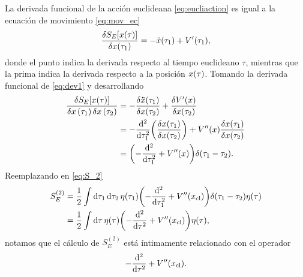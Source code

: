 La derivada funcional de la acción euclideana \eqref{eq:eucliaction} es igual a la ecuación de movimiento \eqref{eq:mov_ec}
\begin{equation} \label{eq:dev1}
	\fdv{S_E\qty[x\qty(\tau)]}{x\qty(\tau_1)} = -\ddot{x}\qty(\tau_1) + V'\qty(\tau_1),
\end{equation}
donde el punto indica la derivada respecto al tiempo euclideano $\tau$, mientras que la prima indica la derivada respecto a la posición $x\qty(\tau)$. Tomando la derivada funcional de \eqref{eq:dev1} y desarrollando 
\begin{align}
\frac{\var{S_E[x\qty(\tau)]}}{{\var{x}(\tau_1)} \var{x}\qty(\tau_2)} &= -\fdv{\ddot{x}\qty(\tau_1)}{x\qty(\tau_2)} + \fdv{V'\qty(x)}{x\qty(\tau_2)} \\
&= -\dv[2]{\tau_1}\qty(\fdv{x\qty(\tau_1)}{x\qty(\tau_2)}) + V''\qty(x)\fdv{x\qty(\tau_1)}{x\qty(\tau_2)} \\
&= \qty(-\dv[2]{\tau_1} + V''\qty(x)) \delta\qty(\tau_1 - \tau_2).
\end{align}
Reemplazando en \eqref{eq:S_2}
\begin{align}
	S_E^{(2)} &= \frac{1}{2} \int \dd{\tau_1} \dd{\tau_2} \eta\qty(\tau_1) \qty(-\dv[2]{\tau_1} + V''\qty(x_{\text{cl}}))\delta\qty(\tau_1 - \tau_2) \eta\qty(\tau) \\ \label{eq:S_2_1}
	&= \frac{1}{2} \int \dd{\tau} \eta\qty(\tau) \qty(-\dv[2]{\tau} + V''\qty(x_{\text{cl}})) \eta\qty(\tau),
\end{align}
notamos que el cálculo de $S_E^{(2)}$ está íntimamente relacionado con el operador
\begin{equation} \label{eq:operador}
	-\dv[2]{\tau} + V''\qty(x_{\text{cl}}).
\end{equation}

